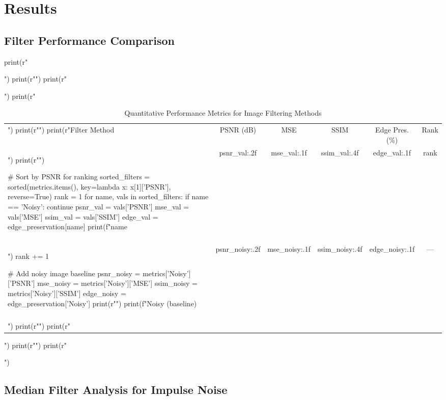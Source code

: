 \documentclass[a4paper, 11pt]{article}
\begin{document}
\section{Results}

\subsection{Filter Performance Comparison}

\begin{pycode}
print(r"\begin{table}[htbp]")
print(r"\centering")
print(r"\caption{Quantitative Performance Metrics for Image Filtering Methods}")
print(r"\begin{tabular}{lccccc}")
print(r"\toprule")
print(r"Filter Method & PSNR (dB) & MSE & SSIM & Edge Pres. (\%) & Rank \\")
print(r"\midrule")

# Sort by PSNR for ranking
sorted_filters = sorted(metrics.items(), key=lambda x: x[1]['PSNR'], reverse=True)
rank = 1
for name, vals in sorted_filters:
    if name == 'Noisy':
        continue
    psnr_val = vals['PSNR']
    mse_val = vals['MSE']
    ssim_val = vals['SSIM']
    edge_val = edge_preservation[name]
    print(f"{name} & {psnr_val:.2f} & {mse_val:.1f} & {ssim_val:.4f} & {edge_val:.1f} & {rank} \\\\")
    rank += 1

# Add noisy image baseline
psnr_noisy = metrics['Noisy']['PSNR']
mse_noisy = metrics['Noisy']['MSE']
ssim_noisy = metrics['Noisy']['SSIM']
edge_noisy = edge_preservation['Noisy']
print(r"\midrule")
print(f"Noisy (baseline) & {psnr_noisy:.2f} & {mse_noisy:.1f} & {ssim_noisy:.4f} & {edge_noisy:.1f} & --- \\\\")
print(r"\bottomrule")
print(r"\end{tabular}")
print(r"\label{tab:performance}")
print(r"\end{table}")
\end{pycode}

\subsection{Median Filter Analysis for Impulse Noise}
\end{document}
